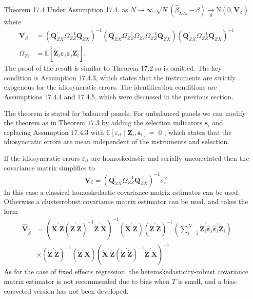\documentclass[10pt]{article}
\begin{document}
Theorem 17.4 Under Assumption 17.4, as $N \rightarrow \infty, \sqrt{N}\left(\widehat{\beta}_{2 s l s}-\beta\right) \underset{d}{\longrightarrow} \mathrm{N}\left(0, \boldsymbol{V}_{\beta}\right)$ where
$$
\begin{aligned}
\boldsymbol{V}_{\beta} &=\left(\boldsymbol{Q}_{Z X}^{\prime} \Omega_{Z Z}^{-1} \boldsymbol{Q}_{Z X}\right)^{-1}\left(\boldsymbol{Q}_{Z X}^{\prime} \Omega_{Z Z}^{-1} \Omega_{Z \varepsilon} \Omega_{Z Z}^{-1} \boldsymbol{Q}_{Z X}\right)\left(\boldsymbol{Q}_{Z X}^{\prime} \Omega_{Z Z}^{-1} \boldsymbol{Q}_{Z X}\right)^{-1} \\
\Omega_{Z \varepsilon} &=\mathbb{E}\left[\dot{\boldsymbol{Z}}_{i}^{\prime} \boldsymbol{\varepsilon}_{i} \boldsymbol{\varepsilon}_{i}^{\prime} \dot{\boldsymbol{Z}}_{i}\right] .
\end{aligned}
$$
The proof of the result is similar to Theorem $17.2$ so is omitted. The key condition is Assumption 17.4.3, which states that the instruments are strictly exogenous for the idiosyncratic errors. The identification conditions are Assumptions 17.4.4 and 17.4.5, which were discussed in the previous section.

The theorem is stated for balanced panels. For unbalanced panels we can modify the theorem as in Theorem $17.3$ by adding the selection indicators $\boldsymbol{s}_{i}$ and replacing Assumption $17.4 .3$ with $\mathbb{E}\left[\varepsilon_{i t} \mid \boldsymbol{Z}_{i}, \boldsymbol{s}_{i}\right]=$ 0 , which states that the idiosyncratic errors are mean independent of the instruments and selection.

If the idiosyncratic errors $\varepsilon_{i t}$ are homoskedastic and serially uncorrelated then the covariance matrix simplifies to
$$
\boldsymbol{V}_{\beta}=\left(\boldsymbol{Q}_{Z X}^{\prime} \Omega_{Z Z}^{-1} \boldsymbol{Q}_{Z X}\right)^{-1} \sigma_{\varepsilon}^{2} .
$$
In this case a classical homoskedastic covariance matrix estimator can be used. Otherwise a clusterrobust covariance matrix estimator can be used, and takes the form
$$
\begin{aligned}
\widehat{\boldsymbol{V}}_{\widehat{\beta}} &=\left(\dot{\boldsymbol{X}}^{\prime} \dot{\boldsymbol{Z}}\left(\dot{\boldsymbol{Z}}^{\prime} \dot{\boldsymbol{Z}}\right)^{-1} \dot{\boldsymbol{Z}}^{\prime} \dot{\boldsymbol{X}}\right)^{-1}\left(\dot{\boldsymbol{X}}^{\prime} \dot{\boldsymbol{Z}}\right)\left(\dot{\boldsymbol{Z}}^{\prime} \dot{\boldsymbol{Z}}\right)^{-1}\left(\sum_{i=1}^{N} \dot{\boldsymbol{Z}}_{i}^{\prime} \widehat{\boldsymbol{\varepsilon}}_{i} \widehat{\boldsymbol{\varepsilon}}_{i}^{\prime} \dot{\boldsymbol{Z}}_{i}\right) \\
& \times\left(\dot{\boldsymbol{Z}}^{\prime} \dot{\boldsymbol{Z}}\right)^{-1}\left(\dot{\boldsymbol{Z}}^{\prime} \dot{\boldsymbol{X}}\right)\left(\dot{\boldsymbol{X}}^{\prime} \dot{\boldsymbol{Z}}\left(\dot{\boldsymbol{Z}}^{\prime} \dot{\boldsymbol{Z}}\right)^{-1} \dot{\boldsymbol{Z}}^{\prime} \dot{\boldsymbol{X}}\right)^{-1}
\end{aligned}
$$
As for the case of fixed effects regression, the heteroskedasticity-robust covariance matrix estimator is not recommended due to bias when $T$ is small, and a bias-corrected version has not been developed.
\end{document}

